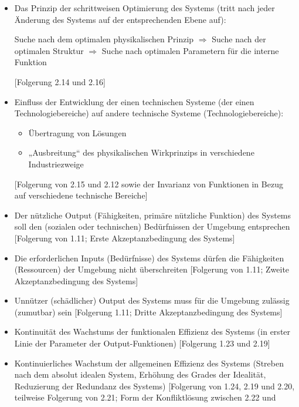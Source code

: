 \documentclass[11pt,a4paper]{article}
\begin{document}
\begin{itemize}
\begin{center}
  Teil $\iff$ Summe aller Teile $\iff$ das Ganze
  \end{center}
  [Folgerung von 2.15 sowie 1.6, 1.18 und 2.7; Form der Konfliktlösung
    zwischen 1.6 und 2.22-2.23]
\item[2.17.] Das Prinzip der schrittweisen Optimierung des Systems (tritt nach
  jeder Änderung des Systems auf der entsprechenden Ebene auf):
  \begin{center}
  Suche nach dem optimalen physikalischen Prinzip $\Longrightarrow$
  Suche nach der optimalen Struktur $\Longrightarrow$
  Suche nach optimalen Parametern für die interne Funktion
  \end{center}
      [Folgerung 2.14 und 2.16]
\item[2.18.] Einfluss der Entwicklung der einen technischen Systeme (der einen
  Technologiebereiche) auf andere technische Systeme (Technologiebereiche):
  \begin{itemize}
  \item  Übertragung von Lösungen
  \item „Ausbreitung“ des physikalischen Wirkprinzips in verschiedene
    Industriezweige
  \end{itemize}
[Folgerung von 2.15 und 2.12 sowie der Invarianz von Funktionen in Bezug auf
  verschiedene technische Bereiche]
\item[2.19.] Der nützliche Output (Fähigkeiten, primäre nützliche Funktion)
  des Systems soll den (sozialen oder technischen) Bedürfnissen der Umgebung
  entsprechen [Folgerung von 1.11; Erste Akzeptanzbedingung des Systems]
\item[2.20.] Die erforderlichen Inputs (Bedürfnisse) des Systems dürfen die
  Fähigkeiten (Ressourcen) der Umgebung nicht überschreiten [Folgerung von
    1.11; Zweite Akzeptanzbedingung des Systems]
\item[2.21.] Unnützer (schädlicher) Output des Systems muss für die Umgebung
  zulässig (zumutbar) sein [Folgerung 1.11; Dritte Akzeptanzbedingung des
    Systems]
\item[2.22.] Kontinuität des Wachstums der funktionalen Effizienz des Systems
  (in erster Linie der Parameter der Output-Funktionen) [Folgerung 1.23 und
  2.19]
\item[2.23.] Kontinuierliches Wachstum der allgemeinen Effizienz des Systems
  (Streben nach dem absolut idealen System, Erhöhung des Grades der Idealität,
  Reduzierung der Redundanz des Systems) [Folgerung von 1.24, 2.19 und 2.20,
    teilweise Folgerung von 2.21; Form der Konfliktlösung zwischen 2.22 und

\end{itemize}
\end{document}
